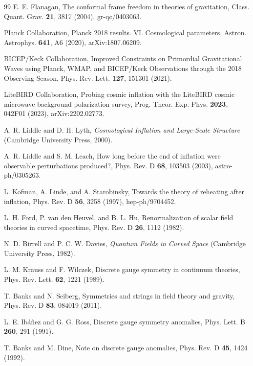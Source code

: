 \documentclass[pdflatex,sn-mathphys-num]{sn-jnl}
\theoremstyle{thmstyleone}
\begin{document}
\begin{thebibliography}{99}
 E. E. Flanagan, The conformal frame freedom in theories of gravitation, Class. Quant. Grav. \textbf{21}, 3817 (2004), gr-qc/0403063.

 Planck Collaboration, Planck 2018 results. VI. Cosmological parameters, Astron. Astrophys. \textbf{641}, A6 (2020), arXiv:1807.06209.

 BICEP/Keck Collaboration, Improved Constraints on Primordial Gravitational Waves using Planck, WMAP, and BICEP/Keck Observations through the 2018 Observing Season, Phys. Rev. Lett. \textbf{127}, 151301 (2021).

 LiteBIRD Collaboration, Probing cosmic inflation with the LiteBIRD cosmic microwave background polarization survey, Prog. Theor. Exp. Phys. \textbf{2023}, 042F01 (2023), arXiv:2202.02773.

 A. R. Liddle and D. H. Lyth, \textit{Cosmological Inflation and Large-Scale Structure} (Cambridge University Press, 2000).

 A. R. Liddle and S. M. Leach, How long before the end of inflation were observable perturbations produced?, Phys. Rev. D \textbf{68}, 103503 (2003), astro-ph/0305263.

 L. Kofman, A. Linde, and A. Starobinsky, Towards the theory of reheating after inflation, Phys. Rev. D \textbf{56}, 3258 (1997), hep-ph/9704452.

 L. H. Ford, P. van den Heuvel, and B. L. Hu, Renormalization of scalar field theories in curved spacetime, Phys. Rev. D \textbf{26}, 1112 (1982).

 N. D. Birrell and P. C. W. Davies, \textit{Quantum Fields in Curved Space} (Cambridge University Press, 1982).

 L. M. Krauss and F. Wilczek, Discrete gauge symmetry in continuum theories, Phys. Rev. Lett. \textbf{62}, 1221 (1989).

 T. Banks and N. Seiberg, Symmetries and strings in field theory and gravity, Phys. Rev. D \textbf{83}, 084019 (2011).

 L. E. Ib\'a\~nez and G. G. Ross, Discrete gauge symmetry anomalies, Phys. Lett. B \textbf{260}, 291 (1991).

 T. Banks and M. Dine, Note on discrete gauge anomalies, Phys. Rev. D \textbf{45}, 1424 (1992).


\end{thebibliography}
\end{document}

